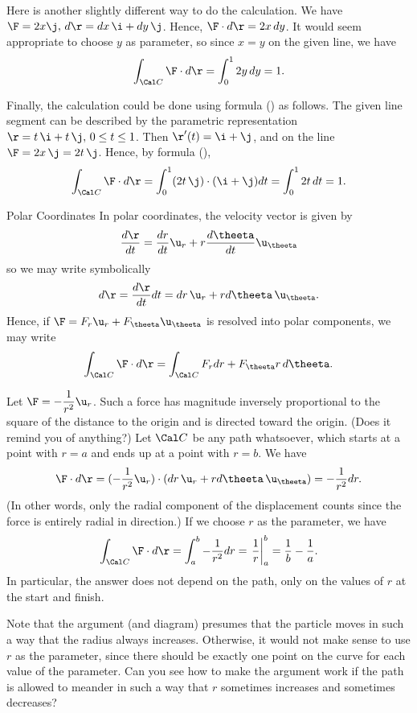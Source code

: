 Here is another slightly different way to do the calculation.
We have $\F = 2x \j, \, d\r = dx\,\i + dy\, \j$.  Hence,
$\F\cdot d\r = 2x\,dy$.   It would seem appropriate to choose
$y$ as parameter, so since $x = y$ on the given line, we have
$$
 \int_{\Cal C}\F\cdot d\r = \int_0^1 2y\,dy = 1.
$$

Finally, the calculation could be done using formula (\LineInt)
as follows.  The given line
segment can be described by the parametric representation
$\r = t\,\i + t \,\j, \, 0\le t \le 1$.   Then
$\r'(t) = \i + \j$, and on the line $\F = 2x\,\j = 2t\,\j$.
Hence, by formula (\LineInt),
$$
  \int_{\Cal C} \F\cdot d\r = \int_0^1(2t\,\j)\cdot(\i + \j)dt
 = \int_0^1 2t\,dt = 1.
$$ 
\endexample

\subhead Polar Coordinates \endsubhead
In polar coordinates, the velocity vector is given by
$$
   \frac{d\r}{dt} = \frac{dr}{dt} \u_r + r\frac{d\theeta}{dt}\u_\theeta
$$
so we may write symbolically
$$
   d\r = \frac{d\r}{dt} dt = dr\,\u_r + rd\theeta\,\u_\theeta.
$$
Hence, if $\F = F_r\u_r + F_\theeta\u_\theeta$ is resolved into
polar components, we may write
$$
  \int_{\Cal C} \F\cdot d\r = \int_{\Cal C} F_rdr + F_\theeta r\,d\theeta.
$$

Let $\F = -\dfrac 1{r^2} \u_r$.    Such a force has magnitude
 inversely proportional to the square of the distance to the origin
and is directed toward the origin.   (Does it remind you of anything?)
Let  $\Cal C$ be any path whatsoever, which starts at a point
with $r = a$ and ends up at a point with $r = b$.   We have
$$
    \F\cdot d\r = (-\frac 1{r^2} \u_r) \cdot (dr\,\u_r + rd\theeta\,\u_\theeta)
      = -\frac 1{r^2} dr.
$$
(In other words, only the radial component of the displacement counts
since the force is entirely radial in direction.)
If we choose $r$ as the parameter, we have
$$
   \int_{\Cal C} \F\cdot d\r = \int_a^b -\frac 1{r^2} dr
            = \left.\frac 1r\right\vert_a^b = \frac 1b - \frac 1a.
$$
In particular, the answer does not depend on the path, only on the
values of $r$ at the start and finish.
\medskip
\centerline{}
\medskip
Note that the argument (and diagram) presumes that the particle moves
in such a way that the radius always increases.  Otherwise, it would
not make sense to use $r$ as the parameter, since there should be
exactly one point on the curve for each value of the parameter.
  Can you see how to make
the argument work if the path is allowed to meander in such a way
that $r$ sometimes increases and sometimes decreases?
\endexample
\bigskip

\goodbreak


\goodbreak
\endchapter
{}
\enddocument
